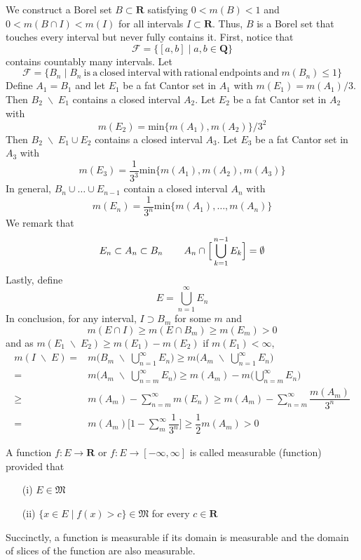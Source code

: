 \begin{ex}
We construct a Borel set $B\subset {\bm R}$ satisfying $0<m(B)<1$ and $0<m(B\cap I)<m(I)$ for all intervals $I\subset {\bm R}$. Thus, $B$ is a Borel set that touches every interval but never fully contains it. First, notice that
\[\mathcal{F}=\{[a,b] \;|\; a,b\in {\bm Q}\}\]
contains countably many intervals. Let
\[\mathcal{F}=\{B_{n} \;|\; B_{n}\mathrm{\ is\ a\ closed\ interval\ with\ rational\ endpoints\ and\ }m(B_{n})\leq 1\}\]
Define $A_1=B_1$ and let $E_1$ be a fat Cantor set in $A_1$ with $m(E_1)=m(A_1)/3$. Then $B_2\;\backslash\;E_1$ contains a closed interval $A_2$. Let $E_2$ be a fat Cantor set in $A_2$ with 
\[
m(E_2)=\mathrm{min}\{m(A_1),m(A_2)\}/3^2\]
Then $B_2\;\backslash\;E_1\cup E_2$ contains a closed interval $A_3$. Let $E_3$ be a fat Cantor set in $A_3$ with
\[m(E_3)=\dfrac{1}{3^3}\mathrm{min}\{m(A_1),m(A_2),m(A_3)\}\]
In general, $B_{n}\cup \ldots \cup E_{n-1}$ contain a closed interval $A_{n}$ with 
\[m(E_{n})=\dfrac{1}{3^{n}}\mathrm{min}\{m(A_1),\ldots ,m(A_{n})\}\]
We remark that 
\[E_{n}\subset A_{n}\subset B_{n}\hspace{5ex}A_{n}\cap \Big[\bigcup ^{n-1}_{k=1}E_{k}\Big]=\emptyset\]
Lastly, define
\[E=\bigcup ^{\infty }_{n=1}E_{n}\]
In conclusion, for any interval, $I\supset B_{m}$ for some $m$ and
\[m(E\cap I)\geq m(E\cap B_{m})\geq m(E_{m})>0\]
and as $m(E_1\;\backslash\;E_2)\geq m(E_1)-m(E_2)$ if $m(E_1)<\infty $,
\begin{align*}
	m(I\;\backslash\;E)=&m\Big(B_{m}\;\backslash\;\bigcup ^{\infty }_{n=1}E_{n}\Big)\geq m\Big(A_{m}\;\backslash\;\bigcup ^{\infty }_{n=1}E_{n}\Big)\\
=&m\Big(A_{m}\;\backslash\;\bigcup ^{\infty }_{n=m}E_{n}\Big)
\geq m(A_{m})-m\Big(\bigcup ^{\infty }_{n=m}E_{n}\Big)\\
\geq & m(A_{m})-\sum ^{\infty }_{n=m}m(E_{n})
\geq m(A_{m})-\sum ^{\infty }_{n=m}\dfrac{m(A_{m})}{3^{n}}\\
=&m(A_{m})\Big[1-\sum ^{\infty }_{m}\dfrac{1}{3^{n}}\Big]
\geq \dfrac{1}{2}m(A_{m})>0
\end{align*}
\end{ex}
\vspace{2ex}
\begin{defi}
	A function $f:E\rightarrow {\bm R}$ or $f:E\rightarrow [-\infty ,\infty ]$ is called measurable (function) provided that
\begin{itemize}
	\item[(i)] $E\in \mathfrak{M}$
	\item[(ii)] $\{x\in E \;|\; f(x)>c\}\in \mathfrak{M}$ for every $c\in {\bm R}$
\end{itemize}
Succinctly, a function is measurable if its domain is measurable and the domain of slices of the function are also measurable.
\end{defi}
